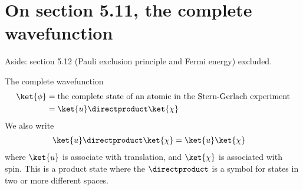 \section{On section 5.11, the complete wavefunction}

Aside: section 5.12 (Pauli exclusion principle and Fermi energy) excluded.

The complete wavefunction
%
\begin{equation}\label{eqn:lecture7sternGerlach:260}
\begin{aligned}
\ket{\phi} &= \text{the complete state of an atomic in the Stern-Gerlach experiment} \\
&=
\ket{u} \directproduct \ket{\chi}
\end{aligned}
\end{equation}
%
We also write
%
\begin{equation}\label{eqn:PHY356Foct26:200}
\begin{aligned}
\ket{u} \directproduct \ket{\chi}  &= \ket{u} \ket{\chi}
\end{aligned}
\end{equation}
%
where \(\ket{u}\) is associate with translation, and \(\ket{\chi}\) is associated with spin.  This is a product state where the \(\directproduct\) is a symbol for states in two or more different spaces.
